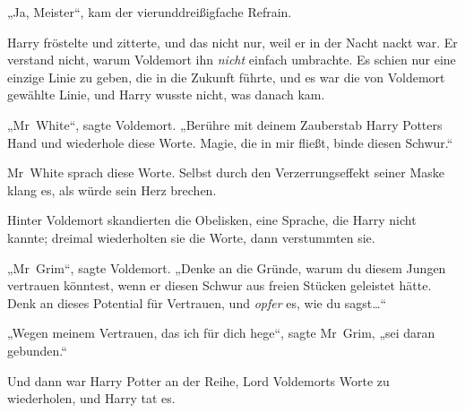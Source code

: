 „Ja, Meister“, kam der vierunddreißigfache Refrain.

Harry fröstelte und zitterte, und das nicht nur, weil er in der Nacht nackt war. Er verstand nicht, warum Voldemort ihn \emph{nicht} einfach umbrachte. Es schien nur eine einzige Linie zu geben, die in die Zukunft führte, und es war die von Voldemort gewählte Linie, und Harry wusste nicht, was danach kam.

„Mr~White“, sagte Voldemort. „Berühre mit deinem Zauberstab Harry Potters Hand und wiederhole diese Worte. Magie, die in mir fließt, binde diesen Schwur.“

Mr~White sprach diese Worte. Selbst durch den Verzerrungseffekt seiner Maske klang es, als würde sein Herz brechen.

Hinter Voldemort skandierten die Obelisken, eine Sprache, die Harry nicht kannte; dreimal wiederholten sie die Worte, dann verstummten sie.

„Mr~Grim“, sagte Voldemort. „Denke an die Gründe, warum du diesem Jungen vertrauen könntest, wenn er diesen Schwur aus freien Stücken geleistet hätte. Denk an dieses Potential für Vertrauen, und \emph{opfer} es, wie du sagst…“

„Wegen meinem Vertrauen, das ich für dich hege“, sagte Mr~Grim, „sei daran gebunden.“

Und dann war Harry Potter an der Reihe, Lord Voldemorts Worte zu wiederholen, und Harry tat es.

